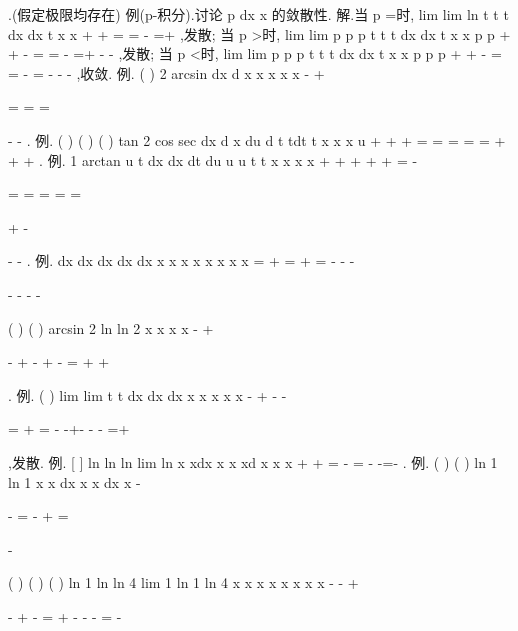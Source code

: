 \int 
.(假定极限均存在) 
\textcolor{lyred}{例(p-积分)}.讨论
p dx
x\int 
的敛散性. 
解.当
p =时,
lim
lim ln
t
t
t
dx
dx
t
x
x
+
+
\to 
\to 
=
=
-
=+\infty 
\int 
\int 
,发散; 
当
p >时,
lim
lim
p
p
p
t
t
t
dx
dx
t
x
x
p
p
+
+
-
\to 
\to 
=
=
-
=+\infty 
-
-
\int 
\int 
,发散; 
当
p <时,
lim
lim
p
p
p
t
t
t
dx
dx
t
x
x
p
p
p
+
+
-
\to 
\to 
=
=
-
=
-
-
-
\int 
\int 
,收敛. 
\textcolor{lyred}{例}.
(
)
2 arcsin
dx
d
x
x
x
x
x
\pi 
-
+


=
=
=


-
-
\int 
\int 
. 
\textcolor{lyred}{例}.
(
)
(
)
(
)
tan
2 cos
sec
dx
d
x
du
d
t
tdt
t
x x
x
u
\pi 
\pi 
+\infty 
+\infty 
+\infty 
=
=
=
=
=
+
+
+
\int 
\int 
\int 
\int 
\int 
. 
\textcolor{lyred}{例}.
1 arctan
u
t
dx
dx
dt
du
u
u
t t
x x
x
x
\pi 
+\infty 
+\infty 
+\infty 
+\infty 
+\infty 
=
-


=
=
=
=
=


+
-


-
-
\int 
\int 
\int 
\int 
. 
\textcolor{lyred}{例}.
dx
dx
dx
dx
dx
x
x
x
x
x
x
x
x
=
+
=
+
=
-
-
-




-
-
-
-








\int 
\int 
\int 
\int 
\int 
(
)
(
)
arcsin 2
ln
ln 2
x
x
x
x
\pi 
-
+




-
+
-
+
-
=
+
+












. 
\textcolor{lyred}{例}.
(
)
lim
lim
t
t
dx
dx
dx
x
x
x
x
x
-
+
\to 
\to 
-
-




=
+
=
-
-+-
-
-
=+\infty 








\int 
\int 
\int 
,发散. 
\textcolor{lyred}{例}.
[
]
ln
ln
ln
lim
ln
x
xdx
x
x
xd
x
x
x
+
+
\to 
=
-
=
-
-=-
\int 
\int 
. 
\textcolor{lyred}{例}.
(
)
(
)
ln 1
ln 1
x
x
dx
x
x
dx
x
-


-
=
-
+
=


-


\int 
\int 
(
)
(
)
(
)
ln 1
ln
ln 4
lim
1 ln 1
ln 4
x
x
x
x
x
x
x
x
-
-
\to 
+


-
+
-
=
+
-
-
-
=
-


